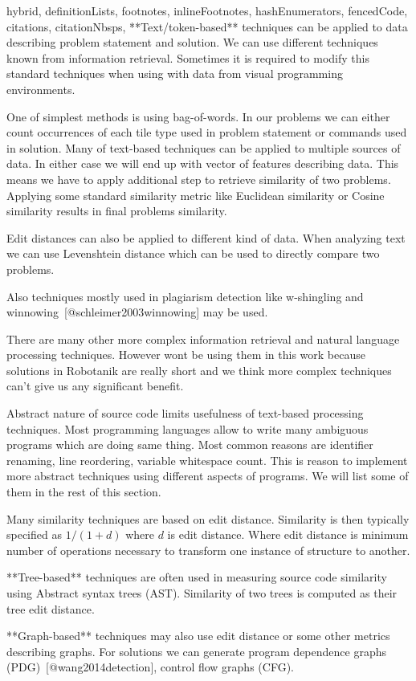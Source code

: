 \documentclass[
  digital, %
  table,   %
  nolof,     %
  nolot,     %
  nocover
]{fithesis3}
\begin{document}
\begin{markdown*}{%
  hybrid,
  definitionLists,
  footnotes,
  inlineFootnotes,
  hashEnumerators,
  fencedCode,
  citations,
  citationNbsps,
}
**Text/token-based** techniques can be applied to data describing problem statement and solution. We can use different techniques known from information retrieval. Sometimes it is required to modify this standard techniques when using with data from visual programming environments.

One of simplest methods is using bag-of-words. In our problems we can either count occurrences of each tile type used in problem statement or commands used in solution. Many of text-based techniques can be applied to multiple sources of data. In either case we will end up with vector of features describing data. This means we have to apply additional step to retrieve similarity of two problems. Applying some standard similarity metric like Euclidean similarity or Cosine similarity results in final problems similarity.

Edit distances can also be applied to different kind of data. When analyzing text we can use Levenshtein distance which can be used to directly compare two problems.

Also techniques mostly used in plagiarism detection like w-shingling and winnowing~[@schleimer2003winnowing] may be used.

There are many other more complex information retrieval and natural language processing techniques. However wont be using them in this work because solutions in Robotanik are really short and we think more complex techniques can't give us any significant benefit.

Abstract nature of source code limits usefulness of text-based processing techniques. Most programming languages allow to write many ambiguous programs which are doing same thing. Most common reasons are identifier renaming, line reordering, variable whitespace count. This is reason to implement more abstract techniques using different aspects of programs. We will list some of them in the rest of this section.

Many similarity techniques are based on edit distance. Similarity is then typically specified as $1/(1+d)$ where $d$ is edit distance. Where edit distance is minimum number of operations necessary to transform one instance of structure to another.

**Tree-based** techniques are often used in measuring source code similarity using Abstract syntax trees (AST). Similarity of two trees is computed as their tree edit distance.

**Graph-based** techniques may also use edit distance or some other metrics describing graphs. For solutions we can generate program dependence graphs (PDG)~[@wang2014detection], control flow graphs (CFG).


\end{markdown*}
\end{document}

